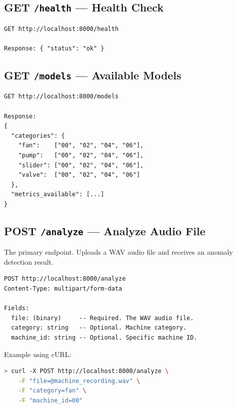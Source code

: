 \documentclass[10pt, a4paper, oneside]{report}
\begin{document}
\subsection{GET \texttt{/health} --- Health Check}

\begin{lstlisting}[caption={Health Check Endpoint}]
GET http://localhost:8000/health

Response: { "status": "ok" }
\end{lstlisting}

\subsection{GET \texttt{/models} --- Available Models}

\begin{lstlisting}[caption={Models Endpoint}]
GET http://localhost:8000/models

Response:
{
  "categories": {
    "fan":    ["00", "02", "04", "06"],
    "pump":   ["00", "02", "04", "06"],
    "slider": ["00", "02", "04", "06"],
    "valve":  ["00", "02", "04", "06"]
  },
  "metrics_available": [...]
}
\end{lstlisting}

\subsection{POST \texttt{/analyze} --- Analyze Audio File}

The primary endpoint. Uploads a WAV audio file and receives an anomaly detection result.

\begin{lstlisting}[caption={Analyze Endpoint --- Request}]
POST http://localhost:8000/analyze
Content-Type: multipart/form-data

Fields:
  file: (binary)     -- Required. The WAV audio file.
  category: string   -- Optional. Machine category.
  machine_id: string -- Optional. Specific machine ID.
\end{lstlisting}

Example using cURL:
\begin{lstlisting}[language=bash, caption={cURL example}]
> curl -X POST http://localhost:8000/analyze \
    -F "file=@machine_recording.wav" \
    -F "category=fan" \
    -F "machine_id=00"
\end{lstlisting}
\end{document}
